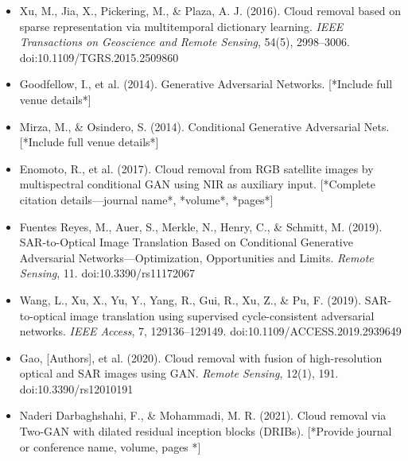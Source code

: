 \begin{itemize}
    \item Xu, M., Jia, X., Pickering, M., & Plaza, A. J. (2016). Cloud removal based on sparse representation via multitemporal dictionary learning. \textit{IEEE Transactions on Geoscience and Remote Sensing}, 54(5), 2998–3006. doi:10.1109/TGRS.2015.2509860

    \item Goodfellow, I., et al. (2014). Generative Adversarial Networks. [*Include full venue details*]

    \item Mirza, M., & Osindero, S. (2014). Conditional Generative Adversarial Nets. [*Include full venue details*]

    \item Enomoto, R., et al. (2017). Cloud removal from RGB satellite images by multispectral conditional GAN using NIR as auxiliary input. [*Complete citation details—journal name*, *volume*, *pages*]

    \item Fuentes Reyes, M., Auer, S., Merkle, N., Henry, C., & Schmitt, M. (2019). SAR-to-Optical Image Translation Based on Conditional Generative Adversarial Networks—Optimization, Opportunities and Limits. \textit{Remote Sensing}, 11. doi:10.3390/rs11172067

    \item Wang, L., Xu, X., Yu, Y., Yang, R., Gui, R., Xu, Z., & Pu, F. (2019). SAR-to-optical image translation using supervised cycle-consistent adversarial networks. \textit{IEEE Access}, 7, 129136–129149. doi:10.1109/ACCESS.2019.2939649

    \item Gao, [Authors], et al. (2020). Cloud removal with fusion of high-resolution optical and SAR images using GAN. \textit{Remote Sensing}, 12(1), 191. doi:10.3390/rs12010191

    \item Naderi Darbaghshahi, F., & Mohammadi, M. R. (2021). Cloud removal via Two-GAN with dilated residual inception blocks (DRIBs). [*Provide journal or conference name, volume, pages *]

    
\end{itemize}

